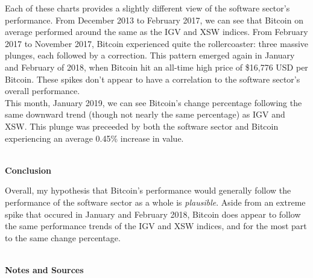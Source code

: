\documentclass[12pt]{article}
\begin{document}
\par Each of these charts provides a slightly different view of the software sector's performance. From December 2013 to February 2017, we can see that Bitcoin on average performed around the same as the IGV and XSW indices. From February 2017 to November 2017, Bitcoin experienced quite the rollercoaster: three massive plunges, each followed by a correction. This pattern emerged again in January and February of 2018, when Bitcoin hit an all-time high price of \$16,776 USD per Bitcoin. These spikes don't appear to have a correlation to the software sector's overall performance.
\pagebreak \\
This month, January 2019, we can see Bitcoin's change percentage following the same downward trend (though not nearly the same percentage) as IGV and XSW. This plunge was preceeded by both the software sector and Bitcoin experiencing an average 0.45\% increase in value. 

\begin{center}
\LARGE \textbf{\\Conclusion}
\end{center}

Overall, my hypothesis that Bitcoin's performance would generally follow the performance of the software sector as a whole is \textit{plausible}. Aside from an extreme spike that occured in January and February 2018, Bitcoin does appear to follow the same performance trends of the IGV and XSW indices, and for the most part to the same change percentage. 

\begin{center}
\LARGE \textbf{\\ Notes and Sources}
\end{center}
\end{document}
